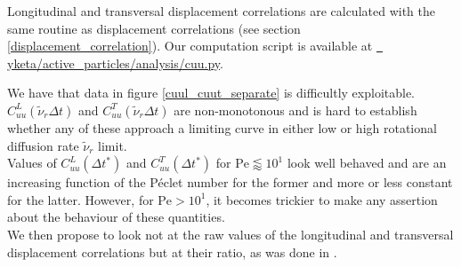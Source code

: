 \documentclass[class=report, float=false, crop=false]{standalone}
\begin{document}
Longitudinal and transversal displacement correlations are calculated with the same routine as displacement correlations (see section \ref{displacement_correlation}). Our computation script is available at \href{https://github.com/yketa/active_particles/blob/master/analysis/cuu.py}{{\faGithub~ yketa/active\_particles/analysis/cuu.py}}.


We have that data in figure \ref{cuul_cuut_separate} is difficultly exploitable. $C_{uu}^L(\tilde{\nu}_r\Delta t)$ and $C_{uu}^T(\tilde{\nu}_r\Delta t)$ are non-monotonous and is hard to establish whether any of these approach a limiting curve in either low or high rotational diffusion rate $\tilde{\nu}_r$ limit.\\

Values of $C_{uu}^L(\Delta t^*)$ and $C_{uu}^T(\Delta t^*)$ for $\text{Pe} \lessapprox 10^1$ look well behaved and are an increasing function of the P\'eclet number for the former and more or less constant for the latter. However, for $\text{Pe} > 10^1$, it becomes trickier to make any assertion about the behaviour of these quantities.\\

We then propose to look not at the raw values of the longitudinal and transversal displacement correlations but at their ratio, as was done in \cite{vasisht2018rate}.
\end{document}
